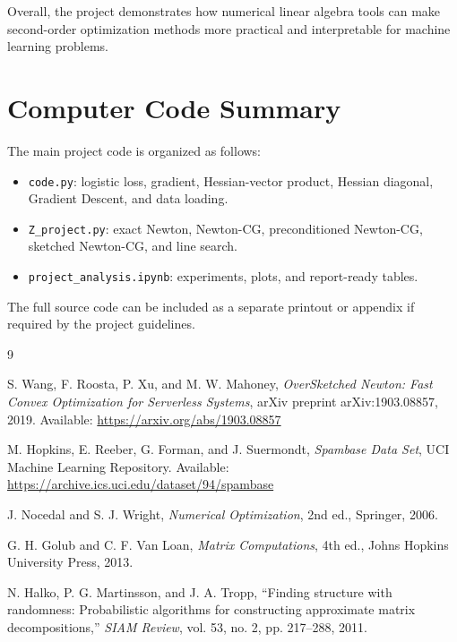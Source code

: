 \documentclass[12pt,a4paper]{report}
\begin{document}
Overall, the project demonstrates how numerical linear algebra tools can make second-order optimization methods more practical and interpretable for machine learning problems.

\appendix

\chapter{Computer Code Summary}

The main project code is organized as follows:

\begin{itemize}
    \item \texttt{code.py}: logistic loss, gradient, Hessian-vector product, Hessian diagonal, Gradient Descent, and data loading.
    \item \texttt{Z\_project.py}: exact Newton, Newton-CG, preconditioned Newton-CG, sketched Newton-CG, and line search.
    \item \texttt{project\_analysis.ipynb}: experiments, plots, and report-ready tables.
\end{itemize}

The full source code can be included as a separate printout or appendix if required by the project guidelines.

\begin{thebibliography}{9}

S. Wang, F. Roosta, P. Xu, and M. W. Mahoney,
\textit{OverSketched Newton: Fast Convex Optimization for Serverless Systems},
arXiv preprint arXiv:1903.08857, 2019.
Available: \url{https://arxiv.org/abs/1903.08857}

M. Hopkins, E. Reeber, G. Forman, and J. Suermondt,
\textit{Spambase Data Set},
UCI Machine Learning Repository.
Available: \url{https://archive.ics.uci.edu/dataset/94/spambase}

J. Nocedal and S. J. Wright,
\textit{Numerical Optimization},
2nd ed., Springer, 2006.

G. H. Golub and C. F. Van Loan,
\textit{Matrix Computations},
4th ed., Johns Hopkins University Press, 2013.

N. Halko, P. G. Martinsson, and J. A. Tropp,
``Finding structure with randomness: Probabilistic algorithms for constructing approximate matrix decompositions,''
\textit{SIAM Review}, vol. 53, no. 2, pp. 217--288, 2011.

\end{thebibliography}
\end{document}
